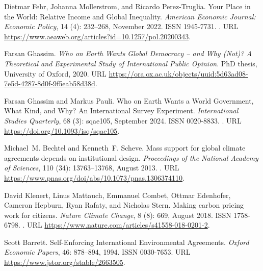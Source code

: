 \documentclass[12pt,english]{article}
\begin{document}
\begin{thebibliography}{55}
  Dietmar Fehr, Johanna Mollerstrom, and Ricardo {Perez-Truglia}.
  \newblock Your {{Place}} in the {{World}}: {{Relative Income}} and {{Global
    Inequality}}.
  \newblock \emph{American Economic Journal: Economic Policy}, 14
    (4): 232--268, November 2022.
  \newblock ISSN 1945-7731.
  \newblock {}.
  \newblock URL \url{https://www.aeaweb.org/articles?id=10.1257/pol.20200343}.
  
  Farsan Ghassim.
  \newblock \emph{Who on Earth Wants Global Democracy -- and Why (Not)? {{A}}
    Theoretical and Experimental Study of International Public Opinion}.
  \newblock PhD thesis, University of Oxford, 2020.
  \newblock URL
    \url{https://ora.ox.ac.uk/objects/uuid:5d63ad08-7e5d-4287-8d0f-9f5eab58d38d}.
  
  Farsan Ghassim and Markus Pauli.
  \newblock Who on {{Earth Wants}} a {{World Government}}, {{What Kind}}, and
    {{Why}}? {{An International Survey Experiment}}.
  \newblock \emph{International Studies Quarterly}, 68 (3):
    sqae105, September 2024.
  \newblock ISSN 0020-8833.
  \newblock {}.
  \newblock URL \url{https://doi.org/10.1093/isq/sqae105}.
  
  Michael~M. Bechtel and Kenneth~F. Scheve.
  \newblock Mass support for global climate agreements depends on institutional
    design.
  \newblock \emph{Proceedings of the National Academy of Sciences}, 110
    (34): 13763--13768, August 2013.
  \newblock {}.
  \newblock URL \url{https://www.pnas.org/doi/abs/10.1073/pnas.1306374110}.
  
  David Klenert, Linus Mattauch, Emmanuel Combet, Ottmar Edenhofer, Cameron
    Hepburn, Ryan Rafaty, and Nicholas Stern.
  \newblock Making carbon pricing work for citizens.
  \newblock \emph{Nature Climate Change}, 8 (8): 669, August
    2018.
  \newblock ISSN 1758-6798.
  \newblock {}.
  \newblock URL \url{https://www.nature.com/articles/s41558-018-0201-2}.
  
  Scott Barrett.
  \newblock Self-{{Enforcing International Environmental Agreements}}.
  \newblock \emph{Oxford Economic Papers}, 46: 878--894, 1994.
  \newblock ISSN 0030-7653.
  \newblock URL \url{https://www.jstor.org/stable/2663505}.
  

\end{thebibliography}
\end{document}
